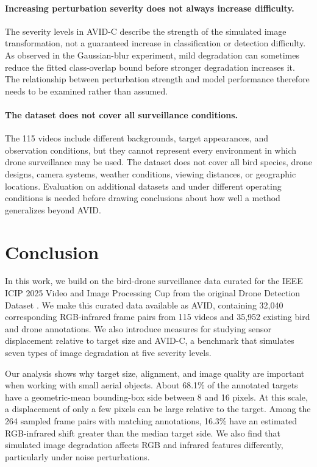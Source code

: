 \documentclass[10pt]{article}
\newcommand{\dataset}{\textsc{AVID}}
\newcommand{\corrupt}{\textsc{AVID-C}}
\begin{document}
\paragraph{Increasing perturbation severity does not always increase difficulty.}
The severity levels in \corrupt{} describe the strength of the simulated image transformation, not a guaranteed increase in classification or detection difficulty. As observed in the Gaussian-blur experiment, mild degradation can sometimes reduce the fitted class-overlap bound before stronger degradation increases it. The relationship between perturbation strength and model performance therefore needs to be examined rather than assumed.

\paragraph{The dataset does not cover all surveillance conditions.}
The 115 videos include different backgrounds, target appearances, and observation conditions, but they cannot represent every environment in which drone surveillance may be used. The dataset does not cover all bird species, drone designs, camera systems, weather conditions, viewing distances, or geographic locations. Evaluation on additional datasets and under different operating conditions is needed before drawing conclusions about how well a method generalizes beyond \dataset{}.


\section{Conclusion}

In this work, we build on the bird-drone surveillance data curated for the IEEE ICIP 2025 Video and Image Processing Cup from the original Drone Detection Dataset \citep{svanstrom2021multisensor}. We make this curated data available as \dataset{}, containing 32,040 corresponding RGB-infrared frame pairs from 115 videos and 35,952 existing bird and drone annotations. We also introduce measures for studying sensor displacement relative to target size and \corrupt{}, a benchmark that simulates seven types of image degradation at five severity levels.

Our analysis shows why target size, alignment, and image quality are important when working with small aerial objects. About 68.1\% of the annotated targets have a geometric-mean bounding-box side between 8 and 16 pixels. At this scale, a displacement of only a few pixels can be large relative to the target. Among the 264 sampled frame pairs with matching annotations, 16.3\% have an estimated RGB-infrared shift greater than the median target side. We also find that simulated image degradation affects RGB and infrared features differently, particularly under noise perturbations.
\end{document}
